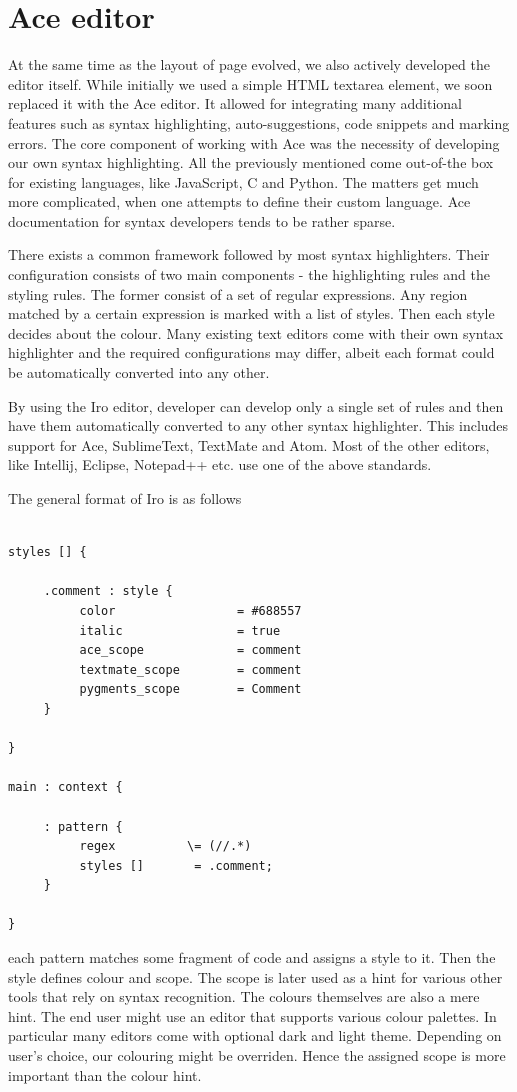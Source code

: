 \section{Ace editor}

At the same time as the layout of page evolved, we also actively developed the editor itself. While initially we used a simple HTML textarea element, we soon replaced it with the Ace editor. It allowed for integrating many additional features such as syntax highlighting, auto-suggestions, code snippets and marking errors. The core component of working with Ace was the necessity of developing our own syntax highlighting. All the previously mentioned come out-of-the box for existing languages, like JavaScript, C and Python. The matters get much more complicated, when one attempts to define their custom language. Ace documentation for syntax developers tends to be rather sparse. 

There exists a common framework followed by most syntax highlighters. Their configuration consists of two main components - the highlighting rules and the styling rules. The former consist of a set of regular expressions. Any region matched by a certain expression is marked with a list of styles. Then each style decides about the colour. Many existing text editors come with their own syntax highlighter and the required configurations may differ, albeit each format could be automatically converted into any other. 

By using the Iro editor, developer can develop only a single set of rules and then have them automatically converted to any other syntax highlighter. This includes support for Ace, SublimeText, TextMate and Atom. Most of the other editors, like Intellij, Eclipse, Notepad++ etc. use one of the above standards. 

The general format of Iro is as follows
\begin{lstlisting}

styles [] {
     
     .comment : style {
          color                 = #688557
          italic                = true
          ace_scope             = comment
          textmate_scope        = comment
          pygments_scope        = Comment
     }
 
}

main : context {
     
     : pattern {
          regex          \= (//.*)
          styles []       = .comment;
     }
 
}
\end{lstlisting}
each pattern matches some fragment of code and assigns a style to it. Then the style defines colour and scope. The scope is later used as a hint for various other tools that rely on syntax recognition. The colours themselves are also a mere hint. The end user might use an editor that supports various colour palettes. In particular many editors come with optional dark and light theme. Depending on user's choice, our colouring might be overriden. Hence the assigned scope is more important than the colour hint.

